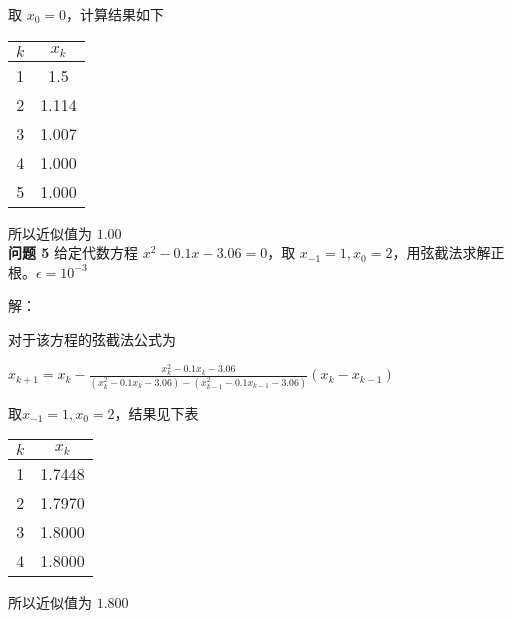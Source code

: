 \documentclass{article}
\begin{document}
取 $x_0 = 0$，计算结果如下

\begin{center}
\begin{tabular}{|c|c|}
    \hline
    $k$ & $x_k$ \\
    \hline
    1 & 1.5 \\
    2 & 1.114 \\
    3 & 1.007 \\
    4 & 1.000 \\
    5 & 1.000 \\
    \hline
\end{tabular}
\end{center}

所以近似值为 $1.00$ \\

\noindent\textbf{问题 5} 给定代数方程 $x^2 - 0.1x - 3.06 = 0$，取 $x_{-1} = 1, x_0 = 2$，用弦截法求解正根。$\epsilon=10^{-3}$

\noindent 解：

对于该方程的弦截法公式为

$x_{k + 1} = x_k - \frac{x_k^2 - 0.1x_k - 3.06}{(x_k^2 - 0.1x_k - 3.06) - (x_{k - 1}^2 - 0.1x_{k - 1} - 3.06)}(x_k - x_{k - 1})$

取$x_{-1} = 1, x_0 = 2$，结果见下表

\begin{center}
\begin{tabular}{|c|c|}
    \hline
    $k$ & $x_k$ \\
    \hline
    1 & 1.7448 \\
    2 & 1.7970 \\
    3 & 1.8000 \\
    4 & 1.8000 \\
    \hline
\end{tabular}
\end{center}

所以近似值为 $1.800$ \\
\end{document}
